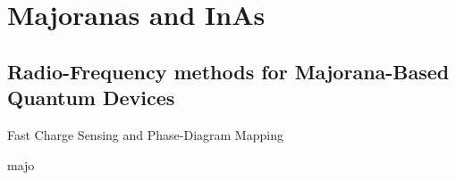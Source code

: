 \chapter{Majoranas and InAs}
\label{sec:majoinas}

\clearpage
\section{Radio-Frequency methods for Majorana-Based\\ Quantum Devices}
{\large \bf \begin{center}Fast Charge Sensing and Phase-Diagram Mapping\end{center}}
\label{sec:rfmajo}
{majo}